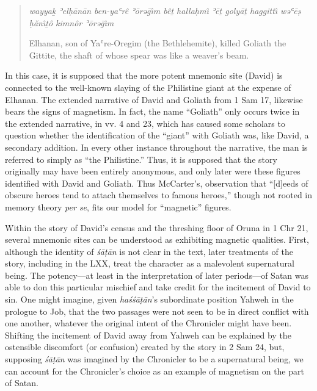 \begin{quote}
\emph{wayyaḵ ʾelḥānān ben-yaʿrê ʾōrəḡı̂m bêṯ hallaḥmı̂ ʾēṯ golyāṯ haggittı̂
wəʿēṣ ḥănı̂ṯô kimnôr ʾōrəḡı̂m}

Elhanan, son of Yaʿre-Oregim (the Bethlehemite), killed Goliath the
Gittite, the shaft of whose spear was like a weaver's beam.
\end{quote}

In this case, it is supposed that the more potent mnemonic site (David)
is connected to the well-known slaying of the Philistine giant at the
expense of Elhanan. The extended narrative of David and Goliath from 1
Sam 17, likewise bears the signs of magnetism. In fact, the name
``Goliath'' only occurs twice in the extended narrative, in vv. 4 and
23, which has caused some scholars to question whether the
identification of the ``giant'' with Goliath was, like David, a
secondary addition. In every other instance throughout the narrative,
the man is referred to simply as ``the Philistine.'' Thus, it is
supposed that the story originally may have been entirely anonymous, and
only later were these figures identified with David and
Goliath.\autocites[For a fuller account of the textual issues
surrounding the main narrative about David and Goliath,
see,][280--309]{mccarter1980}[and][69--77]{mckenzie2000} Thus
McCarter's, observation that ``{[}d{]}eeds of obscure heroes tend to
attach themselves to famous heroes,''\autocite[450]{mccarter1984} though
not rooted in memory theory \emph{per se}, fits our model for
``magnetic'' figures.

Within the story of David's census and the threshing floor of Oruna in 1
Chr 21, several mnemonic sites can be understood as exhibiting magnetic
qualities. First, although the identity of \emph{śāṭān} is not clear in
the text, later treatments of the story, including in the LXX, treat the
character as a malevolent supernatural being. The potency---at least in
the interpretation of later periods---of Satan was able to don this
particular mischief and take credit for the incitement of David to sin.
One might imagine, given \emph{haśśāṭān}'s subordinate position
\visavis Yahweh in the prologue to Job, that the two
passages were not seen to be in direct conflict with one another,
whatever the original intent of the Chronicler might have been. Shifting
the incitement of David away from Yahweh can be explained by the
ostensible discomfort (or confusion) created by the story in 2 Sam 24,
but, supposing \emph{śāṭān} was imagined by the Chronicler to be a
supernatural being, we can account for the Chronicler's choice as an
example of magnetism on the part of Satan.

